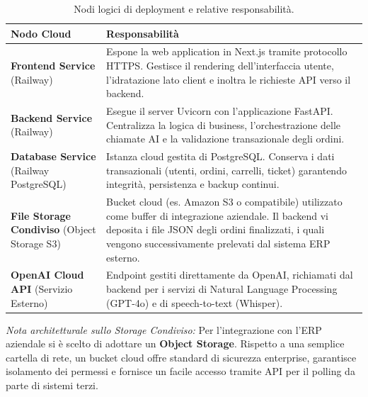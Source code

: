 \documentclass[a4paper, 11pt, oneside]{scrartcl}
\begin{document}
\begin{table}[H]
    \centering
    \renewcommand{\arraystretch}{1.5}
    \begin{tabularx}{\textwidth}{@{}lX@{}}
        \toprule
        \textbf{Nodo Cloud} & \textbf{Responsabilità} \\
        \midrule
        \textbf{Frontend Service} \newline (Railway) & Espone la web application in Next.js tramite protocollo HTTPS. Gestisce il rendering dell'interfaccia utente, l'idratazione lato client e inoltra le richieste API verso il backend. \\
        \textbf{Backend Service} \newline (Railway) & Esegue il server Uvicorn con l'applicazione FastAPI. Centralizza la logica di business, l'orchestrazione delle chiamate AI e la validazione transazionale degli ordini. \\
        \textbf{Database Service} \newline (Railway PostgreSQL) & Istanza cloud gestita di PostgreSQL. Conserva i dati transazionali (utenti, ordini, carrelli, ticket) garantendo integrità, persistenza e backup continui. \\
        \textbf{File Storage Condiviso} \newline (Object Storage S3) & Bucket cloud (es. Amazon S3 o compatibile) utilizzato come buffer di integrazione aziendale. Il backend vi deposita i file JSON degli ordini finalizzati, i quali vengono successivamente prelevati dal sistema ERP esterno. \\
        \textbf{OpenAI Cloud API} \newline (Servizio Esterno) & Endpoint gestiti direttamente da OpenAI, richiamati dal backend per i servizi di Natural Language Processing (GPT-4o) e di speech-to-text (Whisper). \\
        \bottomrule
    \end{tabularx}
    \caption{Nodi logici di deployment e relative responsabilità.}
\end{table}

\textit{Nota architetturale sullo Storage Condiviso:} Per l'integrazione con l'ERP aziendale si è scelto di adottare un \textbf{Object Storage}. Rispetto a una semplice cartella di rete, un bucket cloud offre standard di sicurezza enterprise, garantisce isolamento dei permessi e fornisce un facile accesso tramite API per il polling da parte di sistemi terzi.
\end{document}
